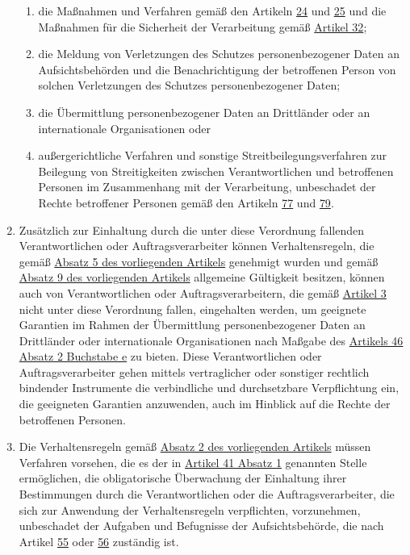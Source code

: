 \begin{enumerate}
\begin{enumerate}
    \item die Maßnahmen und Verfahren gemäß den Artikeln \hyperref[ch:24]{24} und \hyperref[ch:25]{25} und die Maßnahmen
     für die Sicherheit der Verarbeitung gemäß \hyperref[ch:32]{Artikel 32};
    \label{itm:40-2h}

    \item die Meldung von Verletzungen des Schutzes personenbezogener Daten an Aufsichtsbehörden und die
     Benachrichtigung der betroffenen Person von solchen Verletzungen des Schutzes personenbezogener Daten;
    \label{itm:40-2i}

    \item die Übermittlung personenbezogener Daten an Drittländer oder an internationale Organisationen oder
    \label{itm:40-2j}

    \item außergerichtliche Verfahren und sonstige Streitbeilegungsverfahren zur Beilegung von Streitigkeiten zwischen
     Verantwortlichen und betroffenen Personen im Zusammenhang mit der Verarbeitung, unbeschadet der Rechte betroffener
     Personen gemäß den Artikeln \hyperref[ch:77]{77} und \hyperref[ch:79]{79}.
    \label{itm:40-2k}

  \end{enumerate}

  \item Zusätzlich zur Einhaltung durch die unter diese Verordnung fallenden Verantwortlichen oder Auftragsverarbeiter
   können Verhaltensregeln, die gemäß \hyperref[itm:40-5]{Absatz 5 des vorliegenden Artikels} genehmigt wurden und
   gemäß \hyperref[itm:40-9]{Absatz 9 des vorliegenden Artikels} allgemeine Gültigkeit besitzen, können auch von
   Verantwortlichen oder Auftragsverarbeitern, die gemäß \hyperref[ch:3]{Artikel 3} nicht unter diese Verordnung
   fallen, eingehalten werden, um geeignete Garantien im Rahmen der Übermittlung personenbezogener Daten an Drittländer
   oder internationale Organisationen nach Maßgabe des \hyperref[itm:46-2e]{Artikels 46 Absatz 2 Buchstabe e} zu
   bieten. Diese Verantwortlichen oder Auftragsverarbeiter gehen mittels vertraglicher oder sonstiger rechtlich
   bindender Instrumente die verbindliche und durchsetzbare Verpflichtung ein, die geeigneten Garantien anzuwenden,
   auch im Hinblick auf die Rechte der betroffenen Personen.
  \label{itm:40-3}

  \item Die Verhaltensregeln gemäß \hyperref[itm:40-2]{Absatz 2 des vorliegenden Artikels} müssen Verfahren vorsehen,
   die es der in \hyperref[itm:41-2]{Artikel 41 Absatz 1} genannten Stelle ermöglichen, die obligatorische Überwachung
   der Einhaltung ihrer Bestimmungen durch die Verantwortlichen oder die Auftragsverarbeiter, die sich zur Anwendung
   der Verhaltensregeln verpflichten, vorzunehmen, unbeschadet der Aufgaben und Befugnisse der Aufsichtsbehörde, die
   nach Artikel \hyperref[ch:55]{55} oder \hyperref[ch:56]{56} zuständig ist.
  \label{itm:40-4}


\end{enumerate}
